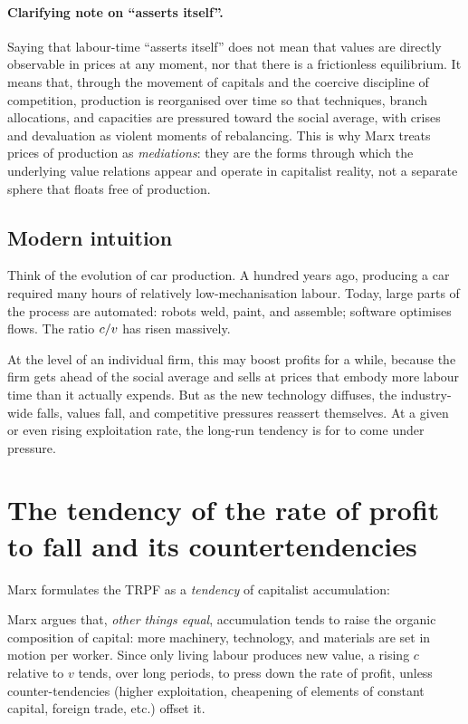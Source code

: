 \begin{example}
\paragraph{Clarifying note on ``asserts itself''.}
Saying that labour-time ``asserts itself'' does not mean that values are directly observable in prices at any moment, nor that there is a frictionless equilibrium.
It means that, through the movement of capitals and the coercive discipline of competition, production is reorganised over time so that
techniques, branch allocations, and capacities are pressured toward the social average, with crises and devaluation as violent moments of rebalancing.
This is why Marx treats prices of production as \emph{mediations}: they are the forms through which the underlying value relations
appear and operate in capitalist reality, not a separate sphere that floats free of production.
\end{example}

\subsection{Modern intuition}

Think of the evolution of car production. A hundred years ago, producing a
car required many hours of relatively low-mechanisation labour. Today, large
parts of the process are automated: robots weld, paint, and assemble; software
optimises flows. The ratio $c/v$ has risen massively.

At the level of an individual firm, this may boost profits for a while,
because the firm gets ahead of the social average and sells at prices that
embody more labour time than it actually expends. But as the new technology
diffuses, the industry-wide \snlt{} falls, values fall, and competitive
pressures reassert themselves. At a given or even rising exploitation rate,
the long-run tendency is for \profitrate{} to come under pressure.

\section{The tendency of the rate of profit to fall and its countertendencies}
\label{sec:trpf}

Marx formulates the TRPF as a \emph{tendency} of capitalist accumulation:\cite{Marx1894,Roberts2015}

Marx argues that, \emph{other things equal}, accumulation tends to raise the organic composition of capital:
more machinery, technology, and materials are set in motion per worker. Since only living labour produces
new value, a rising $c$ relative to $v$ tends, over long periods, to press down the rate of profit, unless
counter-tendencies (higher exploitation, cheapening of elements of constant capital, foreign trade, etc.)
offset it.

